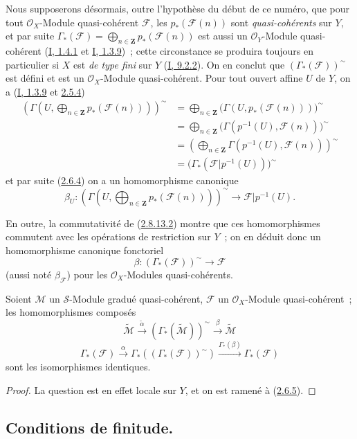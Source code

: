 \begin{env}[3.3.4]
\label{II.3.3.4-fr}
Nous supposerons désormais, outre l'hypothèse du début de ce numéro, que pour
tout $\mathcal{O}_X$-Module quasi-cohérent $\mathcal{F}$, les
$p_*(\mathcal{F}(n))$ sont \emph{quasi-cohérents} sur $Y$, et par suite
$\Gamma_*(\mathcal{F})=\bigoplus_{n\in\mathbf{Z}}p_*(\mathcal{F}(n))$ est
aussi un $\mathcal{O}_Y$-Module quasi-cohérent
(\hyperref[I.1.4.1-fr]{I, 1.4.1} et
\hyperref[I.1.3.9-fr]{I, 1.3.9})~; cette circonstance se produira toujours en
particulier si $X$ est \emph{de type fini} sur $Y$
(\hyperref[I.9.2.2-fr]{I, 9.2.2}). On en conclut que
$(\Gamma_*(\mathcal{F}))^{\sim}$ est défini et est un
$\mathcal{O}_X$-Module quasi-cohérent. Pour tout ouvert affine $U$ de $Y$, on
a (\hyperref[I.1.3.9-fr]{I, 1.3.9} et
\hyperref[II.2.5.4-fr]{2.5.4})
\begin{align*}
  \left(\Gamma\left(U,\bigoplus_{n\in\mathbf{Z}}
  p_*(\mathcal{F}(n))\right)\right)^{\sim}
  &=\bigoplus_{n\in\mathbf{Z}}
  \bigl(\Gamma(U,p_*(\mathcal{F}(n)))\bigr)^{\sim}\\
  &=\bigoplus_{n\in\mathbf{Z}}
  \bigl(\Gamma(p^{-1}(U),\mathcal{F}(n))\bigr)^{\sim}\\
  &=\left(\bigoplus_{n\in\mathbf{Z}}
  \Gamma(p^{-1}(U),\mathcal{F}(n))\right)^{\sim}\\
  &=\bigl(\Gamma_*(\mathcal{F}|p^{-1}(U))\bigr)^{\sim}
\end{align*}
et par suite (\hyperref[II.2.6.4-fr]{2.6.4}) on a un homomorphisme canonique
\[
  \beta_U:\left(\Gamma\left(U,\bigoplus_{n\in\mathbf{Z}}
  p_*(\mathcal{F}(n))\right)\right)^{\sim}
  \longrightarrow\mathcal{F}|p^{-1}(U).
\]

En outre, la commutativité de
(\hyperref[II.2.8.13.2-fr]{2.8.13.2}) montre que ces homomorphismes commutent
avec les opérations de restriction sur $Y$~; on en déduit donc un
homomorphisme canonique fonctoriel
\[
\label{II.3.3.4.1-fr}
  \beta:(\Gamma_*(\mathcal{F}))^{\sim}\longrightarrow\mathcal{F}
\tag{3.3.4.1}
\]
(aussi noté $\beta_{\mathcal{F}}$) pour les $\mathcal{O}_X$-Modules
quasi-cohérents.
\end{env}

\begin{proposition}[3.3.5]
\label{II.3.3.5-fr}
Soient $\mathcal{M}$ un $\mathcal{S}$-Module gradué quasi-cohérent,
$\mathcal{F}$ un $\mathcal{O}_X$-Module quasi-cohérent~; les homomorphismes
composés
\[
\label{II.3.3.5.1-fr}
  \widetilde{\mathcal{M}}
  \xrightarrow{\widetilde{\alpha}}
  (\Gamma_*(\widetilde{\mathcal{M}}))^{\sim}
  \xrightarrow{\beta}\widetilde{\mathcal{M}}
\tag{3.3.5.1}
\]
\[
\label{II.3.3.5.2-fr}
  \Gamma_*(\mathcal{F})\xrightarrow{\alpha}
  \Gamma_*((\Gamma_*(\mathcal{F}))^{\sim})
  \xrightarrow{\Gamma_*(\beta)}\Gamma_*(\mathcal{F})
\tag{3.3.5.2}
\]
sont les isomorphismes identiques.
\end{proposition}

\begin{proof}
La question est en effet locale sur $Y$, et on est ramené à
(\hyperref[II.2.6.5-fr]{2.6.5}).
\end{proof}

\subsection{Conditions de finitude.}
\label{subsection:II.3.4-fr}

